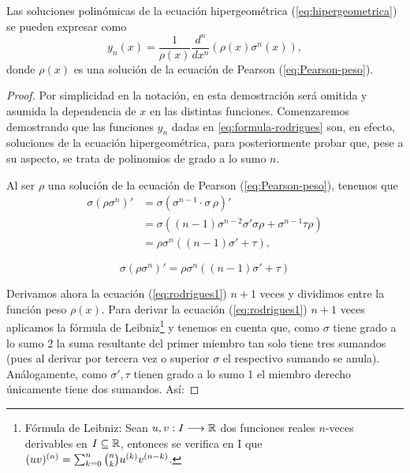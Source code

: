 \begin{teorema}
    \label{th:formula-rodrigues}
    Las soluciones polinómicas de la ecuación hipergeométrica (\ref{eq:hipergeometrica}) se pueden expresar como
    \begin{equation}
        \label{eq:formula-rodrigues}
        y_n(x) = \dfrac 1 {\rho(x)} \dfrac{d^n}{dx^n} (\rho(x) \sigma^n(x)),
    \end{equation}
    donde $\rho(x)$ es una solución de la ecuación de Pearson (\ref{eq:Pearson-peso}).
\end{teorema}
\begin{proof}
    Por simplicidad en la notación, en esta demostración será omitida y asumida la dependencia de $x$ en las distintas funciones. Comenzaremos demostrando que las funciones $y_n$ dadas en \eqref{eq:formula-rodrigues} son, en efecto, soluciones de la ecuación hipergeométrica, para posteriormente probar que, pese a su aspecto, se trata de polinomios de grado a lo sumo $n$.

    Al ser $\rho$ una solución de la ecuación de Pearson (\ref{eq:Pearson-peso}), tenemos que
    \begin{equation*}
        \begin{split}
            \sigma(\rho \sigma^n)' &= \sigma (\sigma^{n-1}\cdot \sigma \, \rho )' \\
            &= \sigma ((n-1)\sigma^{n-2}\sigma'\sigma\rho + \sigma^{n-1}\tau\rho) \\
            &= \rho \sigma^n ((n-1)\sigma'+\tau),
        \end{split}
    \end{equation*}

    \begin{equation}
        \label{eq:rodrigues1}
        \sigma(\rho \sigma^n)'=\rho \sigma^n ((n-1)\sigma'+\tau)
    \end{equation}

    Derivamos ahora la ecuación (\ref{eq:rodrigues1}) $n+1$ veces y dividimos entre la función peso $\rho(x)$. Para derivar la ecuación (\ref{eq:rodrigues1}) $n+1$ veces aplicamos la fórmula de Leibniz\footnote{Fórmula de Leibniz: Sean $u,v:I\longrightarrow\mathbb{R}$ dos funciones reales $n$-veces derivables en $I\subseteq\mathbb{R}$, entonces se verifica en I que $(uv)^{(n)}=\nolinebreak\sum_{k=0}^n \binom{n}{k} u^{(k)}v^{(n-k)}$.} y tenemos en cuenta que, como $\sigma$ tiene grado a lo sumo 2 la suma resultante del primer miembro tan solo tiene tres sumandos (pues al derivar por tercera vez o superior $\sigma$ el respectivo sumando se anula). Análogamente, como $\sigma',\tau$ tienen grado a lo sumo 1 el miembro derecho únicamente tiene dos sumandos. Así:


\end{proof}
